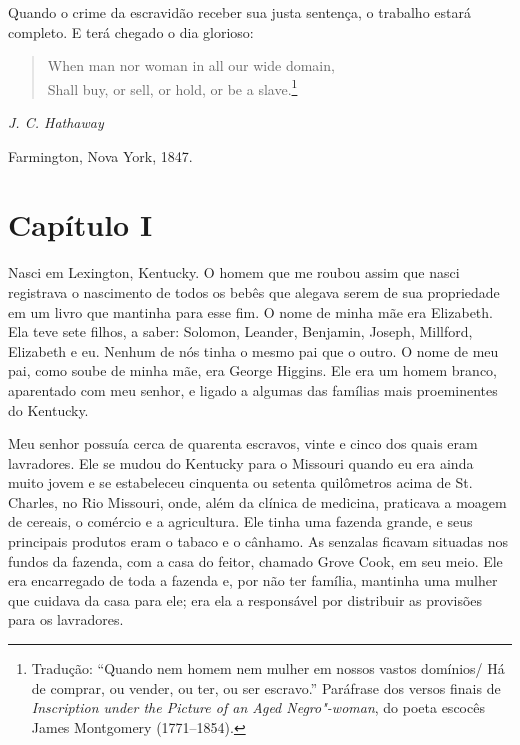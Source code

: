 Quando o crime da escravidão receber sua justa sentença, o trabalho
estará completo. E terá chegado o dia glorioso:

\begin{verse}
When man nor woman in all our wide \qb{}domain,\\
Shall buy, or sell, or hold, or be a slave.\footnote{Tradução: ``Quando nem homem nem mulher em nossos vastos domínios/ Há de comprar, ou vender, ou ter, ou ser escravo.'' Paráfrase dos versos finais de \emph{Inscription under the Picture of an Aged Negro"-woman}, do poeta escocês James Montgomery (1771--1854).}
\end{verse}

\bigskip

\begin{flushright}
\emph{J. C. Hathaway}

Farmington, Nova York, 1847.
\end{flushright}



\chapter*{Capítulo I}

Nasci em Lexington, Kentucky. O homem que me roubou assim que nasci \label{ref5}
registrava o nascimento de todos os bebês que alegava serem de sua
propriedade em um livro que mantinha para esse fim. O nome de minha mãe
era Elizabeth. Ela teve sete filhos, a saber: Solomon, Leander,
Benjamin, Joseph, Millford, Elizabeth e eu. Nenhum de nós tinha o mesmo
pai que o outro. O nome de meu pai, como soube de minha mãe, era George
Higgins. Ele era um homem branco, aparentado com meu senhor, e ligado a
algumas das famílias mais proeminentes do Kentucky.

Meu senhor possuía cerca de quarenta escravos, vinte e cinco dos quais
eram lavradores. Ele se mudou do Kentucky para o Missouri quando eu era
ainda muito jovem e se estabeleceu cinquenta ou setenta quilômetros
acima de St.\,Charles, no Rio Missouri, onde, além da clínica de
medicina, praticava a moagem de cereais, o comércio e a agricultura. Ele
tinha uma fazenda grande, e seus principais produtos eram o tabaco e o
cânhamo. As senzalas ficavam situadas nos fundos da fazenda, com a casa
do feitor, chamado Grove Cook, em seu meio. Ele era encarregado de toda
a fazenda e, por não ter família, mantinha uma mulher que cuidava da
casa para ele; era ela a responsável por distribuir as provisões para os
lavradores.

